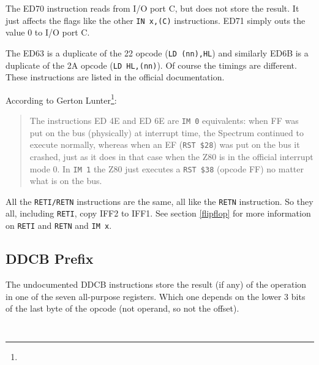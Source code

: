 The ED70 instruction reads from I/O port C, but does not store the result. It just affects the flags like the other {\tt IN x,(C)} instructions. ED71 simply outs the value 0 to I/O port C.

The ED63 is a duplicate of the 22 opcode ({\tt LD (nn),HL}) and similarly ED6B is a duplicate of the 2A opcode ({\tt LD HL,(nn)}). Of course the timings are different. These instructions are listed in the official documentation.

According to Gerton Lunter\footnote{}:

\begin{quote}
    The instructions ED 4E and ED 6E are {\tt IM 0} equivalents: when FF was put on the bus (physically) at interrupt time, the Spectrum continued to execute normally, whereas when an EF ({\tt RST \$28}) was put on the bus it crashed, just as it does in that case when the Z80 is in the official interrupt mode 0. In {\tt IM 1} the Z80 just executes a {\tt RST \$38} (opcode FF) no matter what is on the bus.
\end{quote}

All the {\tt RETI/RETN} instructions are the same, all like the {\tt RETN} instruction. So they all, including {\tt RETI}, copy IFF2 to IFF1. See section \ref{flipflop} for more information on {\tt RETI} and {\tt RETN} and {\tt IM x}.


\subsection{DDCB Prefix}
\label{prefix_cbdd}

The undocumented DDCB instructions store the result (if any) of the operation in one of the seven all-purpose registers. Which one depends on the lower 3 bits of the last byte of the opcode (not operand, so not the offset).

{\tt
    \vspace*{1em}

    \begin{parcolumns}[colwidths={1=0.3\linewidth}]{2}
    \end{parcolumns}
}

